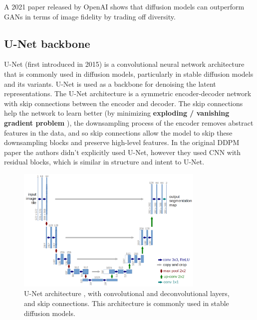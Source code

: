 A 2021 paper released by OpenAI \cite{openai_diffusion_beats_gans} shows that diffusion models can outperform GANs in terms of image fidelity by trading off diversity.














\subsection{U-Net backbone}
\label{subsec:stable_diffusion_u_net_backbone}

U-Net (first introduced in 2015) \cite{unet} is a convolutional neural network architecture that is commonly used in diffusion models, particularly in stable diffusion models and its variants. U-Net is used as a backbone for denoising the latent representations. The U-Net architecture is a symmetric encoder-decoder network with skip connections between the encoder and decoder. The skip connections help the network to learn better (by minimizing \textbf{exploding / vanishing gradient problem} \cite{exploding_vanishing_gradients}), the downsampling process of the encoder removes abstract features in the data, and so skip connections allow the model to skip these downsampling blocks and preserve high-level features. In the original DDPM paper \cite{ddpm} the authors didn't explicitly used U-Net, however they used CNN with residual blocks, which is similar in structure and intent to U-Net. 

\begin{figure}
    \centering
    \includegraphics[width=0.8\textwidth]{images/diffusion_models/stable_diffusion/u-net-architecture.png}
    \caption{U-Net architecture \cite{unet}, with convolutional and deconvolutional layers, and skip connections. This architecture is commonly used in stable diffusion models.}
    \label{fig:unet_architecture}
\end{figure}

